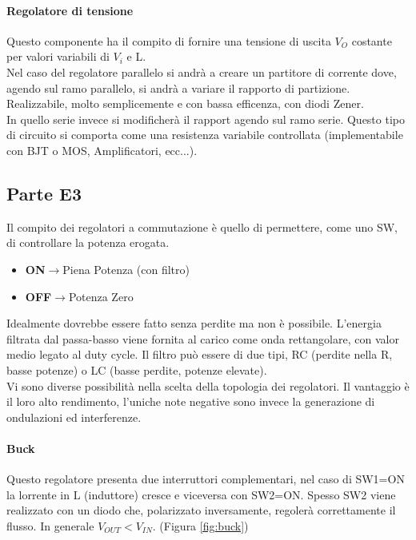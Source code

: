 \documentclass[12pt]{article}
\begin{document}
\paragraph{Regolatore di tensione} Questo componente ha il compito di fornire una tensione di uscita $V_{O}$ costante per valori variabili di $V_{i}$ e L.\\
Nel caso del regolatore parallelo si andrà a creare un partitore di corrente dove, agendo sul ramo parallelo, si andrà a variare il rapporto di partizione. Realizzabile, molto semplicemente e con bassa efficenza, con diodi Zener.\\
In quello serie invece si modificherà il rapport agendo sul ramo serie. Questo tipo di circuito si comporta come una resistenza variabile controllata (implementabile con BJT o MOS, Amplificatori, ecc...).

\subsection{Parte E3}\label{e3} %
Il compito dei regolatori a commutazione è quello di permettere, come uno SW, di controllare la potenza erogata.
\begin{itemize}
  \item \textbf{ON}$\rightarrow$Piena Potenza (con filtro)
  \item \textbf{OFF}$\rightarrow$Potenza Zero
\end{itemize}
Idealmente dovrebbe essere fatto senza perdite ma non è possibile. L'energia filtrata dal passa-basso viene fornita al carico come onda rettangolare, con valor medio legato al duty cycle. Il filtro può essere di due tipi, RC (perdite nella R, basse potenze) o LC (basse perdite, potenze elevate).\\
Vi sono diverse possibilità nella scelta della topologia dei regolatori. Il vantaggio è il loro alto rendimento, l'uniche note negative sono invece la generazione di ondulazioni ed interferenze.

\paragraph{Buck} Questo regolatore presenta due interruttori complementari, nel caso di SW1=ON la lorrente in L (induttore) cresce e viceversa con SW2=ON. Spesso SW2 viene realizzato con un diodo che, polarizzato inversamente, regolerà correttamente il flusso. In generale $V_{OUT}<V_{IN}$. (Figura \ref{fig:buck})
\end{document}
